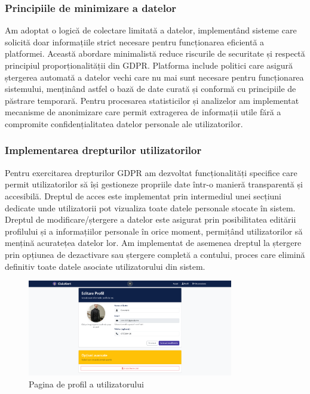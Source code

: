 \documentclass[12pt,a4paper]{report}
\begin{document}
\subsubsection{Principiile de minimizare a datelor}
Am adoptat o logică de colectare limitată a datelor, implementând sisteme care solicită doar informațiile strict necesare pentru funcționarea eficientă a platformei. Această abordare minimalistă reduce riscurile de securitate și respectă principiul proporționalității din GDPR.
Platforma include politici  care asigură ștergerea automată a datelor vechi care nu mai sunt necesare pentru funcționarea sistemului, menținând astfel o bază de date curată și conformă cu principiile de păstrare temporară. Pentru procesarea statisticilor și analizelor am implementat mecanisme de anonimizare care permit extragerea de informații utile fără a compromite confidențialitatea datelor personale ale utilizatorilor.
\subsubsection{Implementarea drepturilor utilizatorilor}
Pentru exercitarea drepturilor GDPR am dezvoltat funcționalități specifice care permit utilizatorilor să își gestioneze propriile date într-o manieră transparentă și accesibilă. Dreptul de acces este implementat prin intermediul unei secțiuni dedicate unde utilizatorii pot vizualiza toate datele personale stocate în sistem.
Dreptul de modificare/ștergere a datelor este asigurat prin posibilitatea editării profilului și a informațiilor personale în orice moment, permițând utilizatorilor să mențină acuratețea datelor lor. Am implementat de asemenea dreptul la ștergere prin opțiunea de dezactivare sau ștergere completă a contului, proces care elimină definitiv toate datele asociate utilizatorului din sistem.

\begin{figure}[H]
    \centering
    \includegraphics[width=0.8\textwidth]{poza_profil.png}
    \caption{Pagina de profil a utilizatorului}
    \label{fig:profil}
\end{figure}
\end{document}
